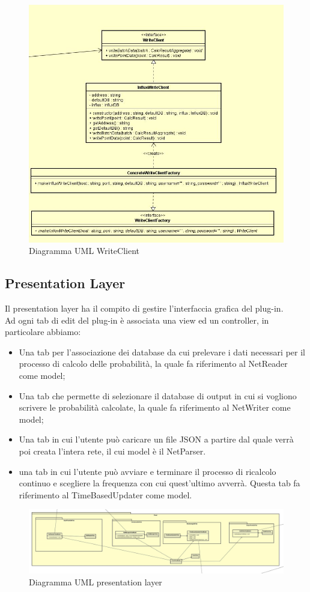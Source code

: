 \begin{figure} [H]
	\centering
	\includegraphics[scale=0.5]{Img/WriteClient}
	\caption{Diagramma UML WriteClient}\label{}
\end{figure}
\subsection{Presentation Layer}
Il presentation layer ha il compito di gestire l'interfaccia grafica del plug-in.\\
Ad ogni tab di edit del plug-in è associata una view ed un controller, in particolare abbiamo:
\begin{itemize}
	\item Una tab per l’associazione dei database da cui prelevare i dati necessari per il processo di calcolo delle probabilità, la quale fa riferimento al NetReader come model;
	\item Una tab che permette di selezionare il database di output in cui si vogliono scrivere le probabilità calcolate, la quale fa riferimento al NetWriter come model;
	\item Una tab in cui l'utente può caricare un file JSON a partire dal quale verrà poi creata l'intera rete, il cui model è il NetParser.
	\item una tab in cui l'utente può avviare e terminare il processo di ricalcolo continuo e scegliere la frequenza con cui quest'ultimo avverrà. Questa tab fa riferimento al TimeBasedUpdater come model.
\end{itemize}
\begin{figure} [H]
	\centering
	\includegraphics[scale=0.17]{Img/PresentationLayer}
	\caption{Diagramma UML presentation layer}\label{}
\end{figure}
\pagebreak
